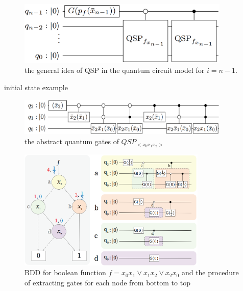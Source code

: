\begin{frame}
  \begin{figure}[htbq]
    \centering
    \includegraphics[width=0.9\textwidth]{figure/QSP.png}
    \caption{the general idea of QSP in the quantum  circuit  model for $i=n-1$.} 
    \label{fig-qsp}
  \end{figure}
\end{frame}
\begin{frame}{initial state example}
  \begin{figure}[htbq]
    \centering
    \includegraphics[width=0.9\textwidth]{figure/qsp_example.png}
    \caption{the abstract quantum gates of $QSP_{<x_0x_1x_2>}$} 
    \label{fig-qsp-example}
  \end{figure}
\end{frame}
\begin{frame}
  \begin{figure}[htbq]
    \centering
    \includegraphics[width=0.8\textwidth]{figure/qsp_circuit.png}
    \caption{BDD  for boolean function $f= x_0x_1\vee x_1x_2 \vee x_2x_0 $ and  the  procedure  of  extracting  gates  for  each node from bottom to top} 
    \label{fig-qsp-example-circuit}
  \end{figure}
\end{frame}
